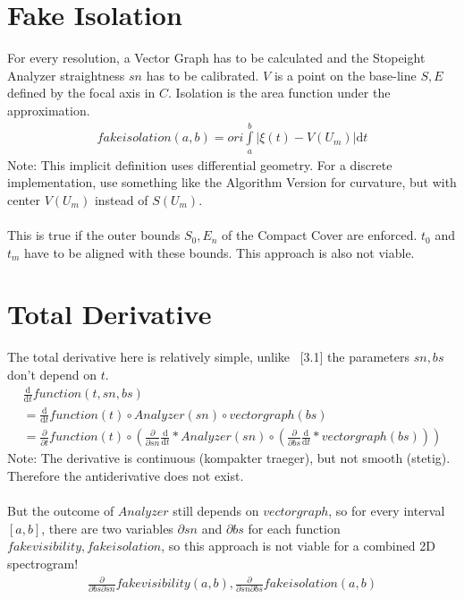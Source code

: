\documentclass{report}
\begin{document}
\section{Fake Isolation}
For every resolution, a Vector Graph has to be calculated and the Stopeight Analyzer straightness $sn$ has to be calibrated. $V$ is a point on the base-line $S,E$ defined by the focal axis in $C$.
Isolation is the area function under the approximation.
\begin{align}
fakeisolation(a,b)= ori \int \limits _{a}^{b} \vert \xi(t)-V(U_{m})\vert  \mathrm{d}t
\end{align}
Note: This implicit definition uses differential geometry. For a discrete implementation, use something like the Algorithm Version for curvature, but with center $V(U_{m})$ instead of $S(U_{m})$.\\\\
This is true if the outer bounds $S_{0},E_{n}$ of the Compact Cover are enforced. $t_{0}$ and $t_{m}$ have to be aligned with these bounds.
This approach is also not viable.

\section{Total Derivative}
The total derivative here is relatively simple, unlike ~\cite{Analyzer}[3.1] the parameters $sn,bs$ don't depend on $t$.
\begin{align}
\frac{\mathrm{d}}{\mathrm{d} t} function(t,sn,bs)\\
= \frac{\mathrm{d}}{\mathrm{d} t} function(t) \circ Analyzer(sn) \circ vectorgraph(bs)\\
= \frac{\partial}{\partial t} function(t) \circ ( \frac{\partial}{\partial sn}  \frac{\mathrm{d} }{\mathrm{d}t} * Analyzer(sn) \circ (\frac{\partial}{\partial bs} \frac{\mathrm{d}}{\mathrm{d}t}*vectorgraph(bs)) )
\end{align}
Note: The derivative is continuous (kompakter traeger), but not smooth (stetig). Therefore the antiderivative does not exist.\\\\
But the outcome of $Analyzer$ still depends on $vectorgraph$, so for every interval $[a,b]$, there are two variables $\partial sn$ and $\partial bs$ for each function $fake visibility, fake isolation$, so this approach is not viable for a combined 2D spectrogram!
\begin{align}
\frac{\partial}{\partial bs\partial sn} fakevisibility(a,b),\frac{\partial}{\partial sn\partial bs} fakeisolation(a,b)
\end{align}
\end{document}
